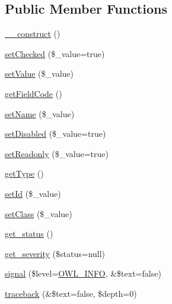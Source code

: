 \subsection*{Public Member Functions}
\begin{DoxyCompactItemize}
\item 
\hyperlink{classFormFieldCheckbox_a9ea37cd03013e361f11680049c1a0097}{\_\-\_\-construct} ()
\item 
\hyperlink{classFormFieldCheckbox_a944623b7e1136bab6dd9880980037425}{setChecked} (\$\_\-value=true)
\item 
\hyperlink{classFormFieldCheckbox_a787abee157599c389a18e0810f69fed5}{setValue} (\$\_\-value)
\item 
\hyperlink{classFormFieldCheckbox_aaa7647c07d938553d8bec7afa869ebc0}{getFieldCode} ()
\item 
\hyperlink{classFormField_ad57e32bd53170af060e869b3b60f0ef7}{setName} (\$\_\-value)
\item 
\hyperlink{classFormField_a9fa2c828eaf98154edfaa2e755657117}{setDisabled} (\$\_\-value=true)
\item 
\hyperlink{classFormField_a6eabbb35d24b1698ea25b66ddfd88a64}{setReadonly} (\$\_\-value=true)
\item 
\hyperlink{classFormField_a1f64b737bccb6b2827f8c5665b9920c7}{getType} ()
\item 
\hyperlink{classBaseElement_a0c1ce3d1684ecb78960cf7a97278494e}{setId} (\$\_\-value)
\item 
\hyperlink{classBaseElement_af6597b30fa9798878f6290271043dfa2}{setClass} (\$\_\-value)
\item 
\hyperlink{class__OWL_a99ec771fa2c5c279f80152cc09e489a8}{get\_\-status} ()
\item 
\hyperlink{class__OWL_adf9509ef96858be7bdd9414c5ef129aa}{get\_\-severity} (\$status=null)
\item 
\hyperlink{class__OWL_a51ba4a16409acf2a2f61f286939091a5}{signal} (\$level=\hyperlink{owl_8severitycodes_8php_a139328861128689f2f4def6a399d9057}{OWL\_\-INFO}, \&\$text=false)
\item 
\hyperlink{class__OWL_aa29547995d6741b7d2b90c1d4ea99a13}{traceback} (\&\$text=false, \$depth=0)
\end{DoxyCompactItemize}
